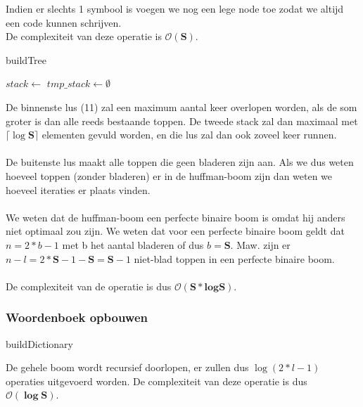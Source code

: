 \documentclass[a4paper,12pt]{report}
\newcommand{\bigO}[1]{$\bm{\mathcal{O}(#1)}$} %
\newcommand\ceil[1]{\lceil#1\rceil}
\begin{document}
Indien er slechts 1 symbool is voegen we nog een lege node toe zodat we altijd een code kunnen schrijven. \\
De complexiteit van deze operatie is \bigO{S}.

\begin{algorithm}[H]
\caption{buildTree}
\SetAlgoLined	
\DontPrintSemicolon
{}
$stack \gets $\;
$tmp\_stack \gets \emptyset$\;
\;
\Return {}
\end{algorithm}
De binnenste lus (11) zal een maximum aantal keer overlopen worden, als de som groter is dan alle reeds bestaande toppen. De tweede stack zal dan maximaal met $\ceil{\log\textbf{S}}$ elementen gevuld worden, en die lus zal dan ook zoveel keer runnen.\\ \\
De buitenste lus maakt alle toppen die geen bladeren zijn aan. Als we dus weten hoeveel toppen (zonder bladeren) er in de huffman-boom zijn dan weten we hoeveel iteraties er plaats vinden. \\ \\
We weten dat de huffman-boom een perfecte binaire boom is omdat hij anders niet optimaal zou zijn. We weten dat voor een perfecte binaire boom geldt dat $n=2*b-1$ met b het aantal bladeren of dus $b=\textbf{S}$. Maw. zijn er $n-l=2*\textbf{S}-1-\textbf{S}=\textbf{S}-1$ niet-blad toppen in een perfecte binaire boom.\\ \\
De complexiteit van de  operatie is dus \bigO{S*logS}.

\subsubsection{Woordenboek opbouwen}
\begin{algorithm}[H]
\caption{buildDictionary}
\SetAlgoLined	
\DontPrintSemicolon
{}
\end{algorithm}
De gehele boom wordt recursief doorlopen, er zullen dus $\log(2*l-1)$ operaties uitgevoerd worden. De complexiteit van deze operatie is dus \bigO{\log S}.
\end{document}
